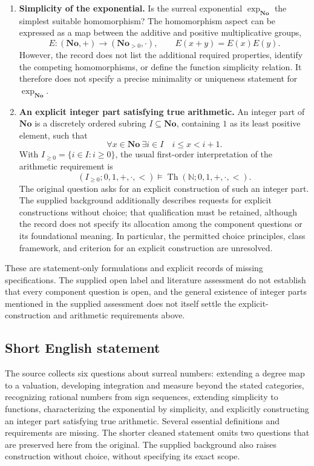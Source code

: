 \documentclass[11pt]{article}
\newcommand{\N}{\mathbb{N}}
\begin{document}
\begin{enumerate}
\item \textbf{Simplicity of the exponential.} Is the surreal exponential \(\exp_{\mathbf{No}}\) the simplest suitable homomorphism? The homomorphism aspect can be expressed as a map between the additive and positive multiplicative groups,
\[
 E\colon(\mathbf{No},+)\longrightarrow(\mathbf{No}_{>0},\cdot),
 \qquad E(x+y)=E(x)E(y).
\]
However, the record does not list the additional required properties, identify the competing homomorphisms, or define the function simplicity relation. It therefore does not specify a precise minimality or uniqueness statement for \(\exp_{\mathbf{No}}\).

\item \textbf{An explicit integer part satisfying true arithmetic.} An integer part of \(\mathbf{No}\) is a discretely ordered subring \(I\subseteq\mathbf{No}\), containing \(1\) as its least positive element, such that
\[
 \forall x\in\mathbf{No}\ \exists i\in I\quad i\leq x<i+1.
\]
With \(I_{\geq0}=\{i\in I:i\geq0\}\), the usual first-order interpretation of the arithmetic requirement is
\[
 (I_{\geq0};0,1,+,\cdot,<)
 \models
 \operatorname{Th}(\N;0,1,+,\cdot,<).
\]
The original question asks for an explicit construction of such an integer part. The supplied background additionally describes requests for explicit constructions without choice; that qualification must be retained, although the record does not specify its allocation among the component questions or its foundational meaning. In particular, the permitted choice principles, class framework, and criterion for an explicit construction are unresolved.
\end{enumerate}

These are statement-only formulations and explicit records of missing specifications. The supplied open label and literature assessment do not establish that every component question is open, and the general existence of integer parts mentioned in the supplied assessment does not itself settle the explicit-construction and arithmetic requirements above.
\subsection{Short English statement}
The source collects six questions about surreal numbers: extending a degree map to a valuation, developing integration and measure beyond the stated categories, recognizing rational numbers from sign sequences, extending simplicity to functions, characterizing the exponential by simplicity, and explicitly constructing an integer part satisfying true arithmetic. Several essential definitions and requirements are missing. The shorter cleaned statement omits two questions that are preserved here from the original. The supplied background also raises construction without choice, without specifying its exact scope.
\end{document}
